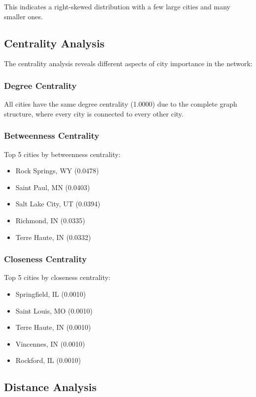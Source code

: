 \documentclass{article}
\begin{document}
This indicates a right-skewed distribution with a few large cities and many smaller ones.

\subsection{Centrality Analysis}

The centrality analysis reveals different aspects of city importance in the network:

\subsubsection{Degree Centrality}
All cities have the same degree centrality (1.0000) due to the complete graph structure, where every city is connected to every other city.

\subsubsection{Betweenness Centrality}
Top 5 cities by betweenness centrality:
\begin{itemize}
    \item Rock Springs, WY (0.0478)
    \item Saint Paul, MN (0.0403)
    \item Salt Lake City, UT (0.0394)
    \item Richmond, IN (0.0335)
    \item Terre Haute, IN (0.0332)
\end{itemize}

\subsubsection{Closeness Centrality}
Top 5 cities by closeness centrality:
\begin{itemize}
    \item Springfield, IL (0.0010)
    \item Saint Louis, MO (0.0010)
    \item Terre Haute, IN (0.0010)
    \item Vincennes, IN (0.0010)
    \item Rockford, IL (0.0010)
\end{itemize}

\subsection{Distance Analysis}
\end{document}
